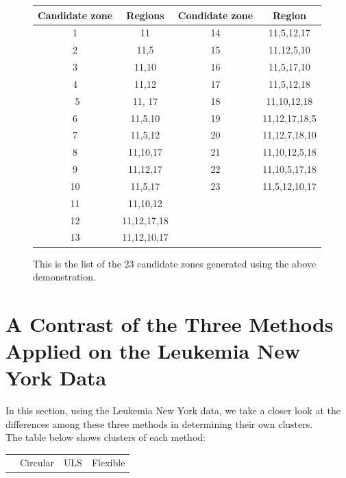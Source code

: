 \documentclass[12pt]{article}
\begin{document}
\begin{enumerate}
\begin{figure}[!ht]
\begin{tabular}{|c|c|c|c|}
		\hline
		Candidate zone & Regions & Condidate zone & Region \\
		\hline
		1 & 11 & 14 & 11,5,12,17 \\
		2 & 11,5 & 	15 & 11,12,5,10 \\
		3 & 11,10 & 16 & 11,5,17,10 \\	
		4 & 11,12 & 	17 & 11,5,12,18 \\\
		5 & 11, 17 & 18 & 11,10,12,18  \\
		6 &  11,5,10 & 19 &  11,12,17,18,5  \\
		7 & 11,5,12 & 20 &   11,12,7,18,10  \\
		8 & 11,10,17 & 21 & 11,10,12,5,18 \\
		9 & 11,12,17  & 22 & 11,10,5,17,18 \\
		10 & 11,5,17 &   23& 11,5,12,10,17 \\
		11 & 11,10,12 & &\\
		12 & 11,12,17,18 & &\\
		13 & 11,12,10,17 & &\\
		
		\hline
		\end{tabular}
		
	\caption{This is the list of the 23 candidate zones generated using the above demonstration. \label{f:gull}}	
	\end{figure}

\newpage
	\section{A Contrast of the Three Methods Applied on the Leukemia New York Data}
	In this section, using the Leukemia New York data, we take a closer look at the differences among these three methods in determining their own clusters. \\
	The table below shows clusters of each method:\\
	
	\begin{tabular}{|c|c|c|c|}
	\hline
	& Circular & ULS & Flexible \\
	

\end{tabular}
\end{enumerate}
\end{document}
